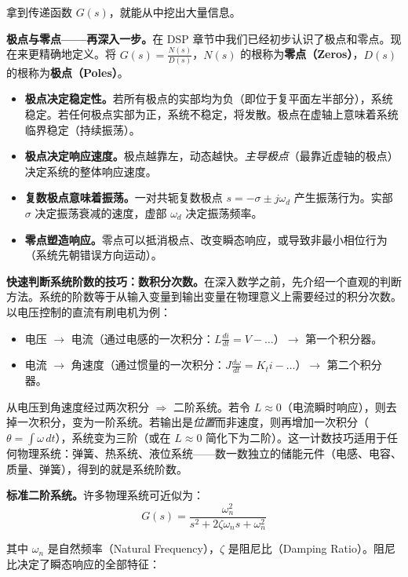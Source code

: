 拿到传递函数 $G(s)$，就能从中挖出大量信息。

\textbf{极点与零点——再深入一步。}在 DSP 章节中我们已经初步认识了极点和零点。现在来更精确地定义。将 $G(s) = \frac{N(s)}{D(s)}$，$N(s)$ 的根称为\textbf{零点（Zeros）}，$D(s)$ 的根称为\textbf{极点（Poles）}。

\begin{itemize}
    \item \textbf{极点决定稳定性。}若所有极点的实部均为负（即位于复平面左半部分），系统稳定。若任何极点实部为正，系统不稳定，将发散。极点在虚轴上意味着系统临界稳定（持续振荡）。
    \item \textbf{极点决定响应速度。}极点越靠左，动态越快。\textit{主导极点}（最靠近虚轴的极点）决定系统的整体响应速度。
    \item \textbf{复数极点意味着振荡。}一对共轭复数极点 $s = -\sigma \pm j\omega_d$ 产生振荡行为。实部 $\sigma$ 决定振荡衰减的速度，虚部 $\omega_d$ 决定振荡频率。
    \item \textbf{零点塑造响应。}零点可以抵消极点、改变瞬态响应，或导致非最小相位行为（系统先朝错误方向运动）。
\end{itemize}

\textbf{快速判断系统阶数的技巧：数积分次数。}在深入数学之前，先介绍一个直观的判断方法。系统的阶数等于从输入变量到输出变量在物理意义上需要经过的积分次数。以电压控制的直流有刷电机为例：
\begin{itemize}[nosep]
    \item 电压 $\to$ 电流（通过电感的一次积分：$L\frac{di}{dt} = V - \ldots$）$\to$ 第一个积分器。
    \item 电流 $\to$ 角速度（通过惯量的一次积分：$J\frac{d\omega}{dt} = K_t i - \ldots$）$\to$ 第二个积分器。
\end{itemize}
从电压到角速度经过两次积分 $\Rightarrow$ 二阶系统。若令 $L \approx 0$（电流瞬时响应），则去掉一次积分，变为一阶系统。若输出是\textit{位置}而非速度，则再增加一次积分（$\theta = \int \omega\,dt$），系统变为三阶（或在 $L \approx 0$ 简化下为二阶）。这一计数技巧适用于任何物理系统：弹簧、热系统、液位系统——数一数独立的储能元件（电感、电容、质量、弹簧），得到的就是系统阶数。

\textbf{标准二阶系统。}许多物理系统可近似为：
\begin{equation}
G(s) = \frac{\omega_n^2}{s^2 + 2\zeta\omega_n s + \omega_n^2}
\end{equation}

其中 $\omega_n$ 是自然频率（Natural Frequency），$\zeta$ 是阻尼比（Damping Ratio）。阻尼比决定了瞬态响应的全部特征：


